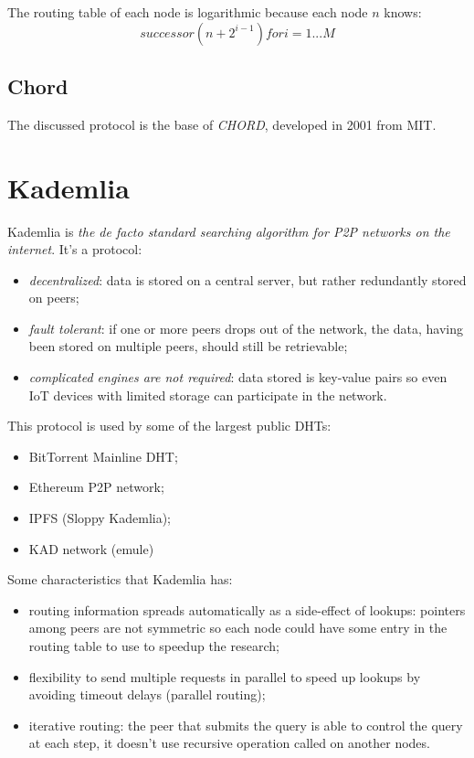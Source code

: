 The routing table of each node is logarithmic because each node $n$ knows:
$$
    successor(n + 2^{i-1}) for i = 1... M
$$

\subsection{Chord}
The discussed protocol is the base of \emph{CHORD}, developed in 2001 from MIT.

\section{Kademlia}
Kademlia is \emph{the de facto standard searching algorithm for P2P networks on the internet}.
It's a protocol:
\begin{itemize}
    \item \emph{decentralized}: data is stored on a central server, but rather redundantly stored on peers;
    \item \emph{fault tolerant}: if one or more peers drops out of the network, the data, having been stored on multiple peers, should still be retrievable;
    \item \emph{complicated engines are not required}: data stored is key-value pairs so even IoT devices with limited storage can participate in the network.
\end{itemize}

This protocol is used by some of the largest public DHTs:
\begin{itemize}
    \item BitTorrent Mainline DHT;
    \item Ethereum P2P network;
    \item IPFS (Sloppy Kademlia);
    \item KAD network (emule)
\end{itemize}

Some characteristics that Kademlia has:
\begin{itemize}
    \item routing information spreads automatically as a side-effect of lookups: pointers among peers are not symmetric so each node could have some entry in the routing table to use to speedup the research;
    \item flexibility to send multiple requests in parallel to speed up lookups by avoiding timeout delays (parallel routing);
    \item iterative routing: the peer that submits the query is able to control the query at each step, it doesn't use recursive operation called on another nodes.
\end{itemize}


